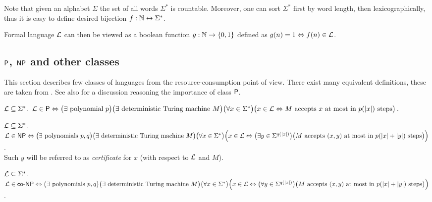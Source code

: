 		\begin{remark}
			Note that given an alphabet $\Sigma$ the set of all words $\Sigma^*$ is countable. Moreover, one can sort $\Sigma^*$ first by word length, then lexicographically, thus it is easy to define desired bijection $f: \N \leftrightarrow \Sigma^* $.
			
			Formal language ${\cal L}$ can then be viewed as a boolean function $g: \N \rightarrow \{0,1\}$ defined as
			$g(n) = 1 \iff f(n)\in {\cal L}$.
		\end{remark}
		
	
	\subsection{$\P$, $\NP$ and other classes}
	\label{sec:PNP}
		
		This section describes few classes of languages from the resource-consumption point of view. There exist many equivalent definitions, these are taken from \cite{book_comp}. See also \cite[Chapter 1.5.1]{book_comp} for a discussion reasoning the importance of class $\P$.
		
		\begin{defn}\label{def:P}
			${\cal L} \subseteq \Sigma^*$. ${\cal L} \in \P \iff \bigl(\exists \textnormal{ polynomial } p \bigr) \bigl(\exists \textnormal{ deterministic Turing machine } M\bigr)\\ \bigl(\forall x \in \Sigma^*\bigr) \bigl(x \in {\cal L} \iff M \textnormal{ accepts } x \textnormal{ at most in } p(|x|) \textnormal{ steps} \bigr)$.
		\end{defn}
		
		\begin{defn}\label{def:NP}
			${\cal L} \subseteq \Sigma^*$. ${\cal L} \in \NP \iff \bigl(\exists \textnormal{ polynomials } p, q \bigr) \bigl(\exists \textnormal{ deterministic Turing machine } M\bigr)\\ \bigl(\forall x \in \Sigma^*\bigr) \Bigl(x \in {\cal L} \iff \bigl(\exists y \in \Sigma^{q(|x|)}\bigr) \bigl(M \textnormal{ accepts } (x,y) \textnormal{ at most in } p(|x|+|y|) \textnormal{ steps} \bigr)\Bigr)$.\\
			Such $y$ will be referred to as {\em certificate} for $x$ (with respect to $\cal L$ and $M$).
		\end{defn}
		
		\begin{defn}\label{def:coNP}
			${\cal L} \subseteq \Sigma^*$. ${\cal L} \in \coNP \iff \bigl(\exists \textnormal{ polynomials } p, q \bigr) \bigl(\exists \textnormal{ deterministic Turing machine } M\bigr)\\ \bigl(\forall x \in \Sigma^*\bigr) \Bigl(x \in {\cal L} \iff \bigl(\forall y \in \Sigma^{q(|x|)}\bigr) \bigl(M \textnormal{ accepts } (x,y) \textnormal{ at most in } p(|x|+|y|) \textnormal{ steps} \bigr)\Bigr)$.
		\end{defn}
		
